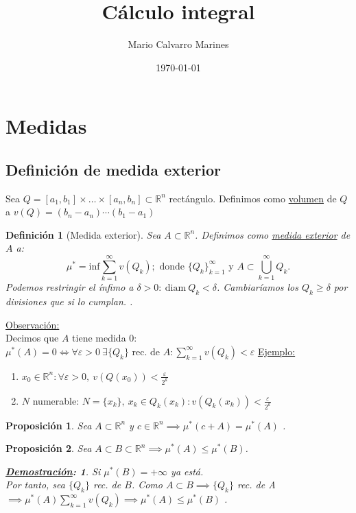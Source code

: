 \documentclass[10pt,a4paper,openright]{book}
\title{Cálculo integral}
\author{Mario Calvarro Marines}
\date{\today}
\theoremstyle{break}
\newtheorem*{defi}{Definición}
\newtheorem*{prop}{Proposición}
\newtheorem*{demo}{\underline{Demostración}:}
\begin{document}
\maketitle
\chapter*{Medidas}%
\label{sec:medidas}
\section*{Definición de medida exterior}%
\label{sub:definicion_de_medida_exterior}
Sea $Q = \left[ a_1, b_1 \right] \times \ldots \times \left[ a_n, b_n \right] \subset \mathbb{R}^{n}$ rectángulo. 
Definimos como \underline{volumen} de $Q$ a $v\left( Q \right) = \left( b_n - a_n \right) \cdots \left( b_1 - a_1 \right)$ 
\begin{defi}[Medida exterior]
   Sea $A \subset \mathbb{R}^{n}$. Definimos como \underline{medida exterior} de $A$ a: \[
   \mu^{*} = \mathrm{inf}\sum_{k=1}^{\infty} v\left( Q_k \right); \text{ donde } \{Q_k\}_{k=1}^{\infty} \text{ y } A \subset \bigcup_{k = 1}^{\infty} Q_k
   .\]  
Podemos restringir el ínfimo a $\delta > 0: \ \mathrm{diam}\ Q_k < \delta$. Cambiaríamos los $Q_k \ge  \delta$ por divisiones que si lo cumplan.
.\end{defi}

\underline{Observación:}\\
Decimos que $A$ tiene medida $0$: $\mu^{*}\left( A \right) = 0 \iff \forall \varepsilon > 0 \ \exists \{Q_k\} \text{ rec. de } A: \sum_{k=1}^{\infty} v\left( Q_k \right) < \varepsilon$     
    \underline{Ejemplo:}
    \begin{enumerate}
       \item $x_0 \in \mathbb{R}^{n}: \forall \varepsilon > 0, \ v\left( Q\left( x_0 \right)  \right) < \frac{\varepsilon}{2^{k}}$
       \item $N$ numerable: $N = \{x_k\}, \ x_k \in Q_k\left( x_k \right): v\left( Q_k\left( x_k \right)  \right) < \frac{\varepsilon}{2^{k}}$
    \end{enumerate}
    
\begin{prop}
   Sea $A \subset \mathbb{R}^{n}$ y $c \in \mathbb{R}^{n} \implies \mu^{*}\left( c + A \right) = \mu^{*}\left( A \right) $   
.\end{prop}
\begin{prop}
   Sea $A \subset B \subset \mathbb{R}^{n} \implies \mu^{*}\left( A \right) \le \mu^{*}\left( B \right) $.
   \begin{demo}
       Si $\mu^{*}\left( B \right) = +\infty$ ya está.\\
       Por tanto, sea $\{Q_k\}$ rec. de $B$. Como $A \subset B \implies \{Q_k\}$ rec. de A $\implies \mu^{*}\left( A \right)
       \sum_{k=1}^{\infty} v\left( Q_k \right) \implies \mu^{*}\left( A \right) \le \mu^{*}\left( B \right) $
   .\end{demo}
\end{prop}
\end{document}
